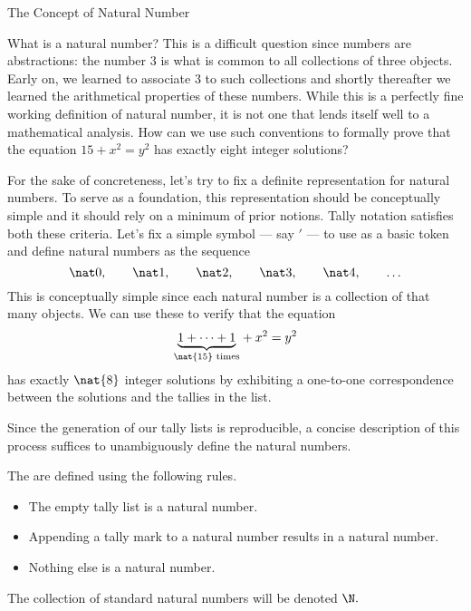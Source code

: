 \begin{unit}{The Concept of Natural Number}

What is a natural number?
This is a difficult question since numbers are abstractions: the number \(3\) is what is common to all collections of three objects.
Early on, we learned to associate \(3\) to such collections and shortly thereafter we learned the arithmetical properties of these numbers.
While this is a perfectly fine working definition of natural number, it is not one that lends itself well to a mathematical analysis.
How can we use such conventions to formally prove that the equation \(15+x^2 = y^2\) has exactly eight integer solutions?

For the sake of concreteness, let's try to fix a definite representation for natural numbers.
To serve as a foundation, this representation should be conceptually simple and it should rely on a minimum of prior notions.
Tally notation satisfies both these criteria.
Let's fix a simple symbol --- say \(\prime\) --- to use as a basic token and define natural numbers as the sequence\[\nat0, \qquad \nat1,  \qquad \nat2, \qquad \nat3, \qquad \nat4, \qquad \ldots\]
This is conceptually simple since each natural number is a collection of that many objects.
We can use these to verify that the equation \[{\underbrace{1+\cdots+1}_{\text{$\nat{15}$ times}}} + x^2 = y^2\] has exactly \(\nat{8}\) integer solutions by exhibiting a one-to-one correspondence between the solutions and the tallies in the list.

Since the generation of our tally lists is reproducible, a concise description of this process suffices to unambiguously define the natural numbers.

\begin{definition}\label{D:N}
  The  are defined using the following rules.
  \begin{itemize}
  \item The empty tally list is a natural number.
  \item Appending a tally mark to a natural number results in a natural number.
  \item Nothing else is a natural number.
  \end{itemize}
  The collection of standard natural numbers will be denoted \(\N.\)
\end{definition}


\end{unit}
